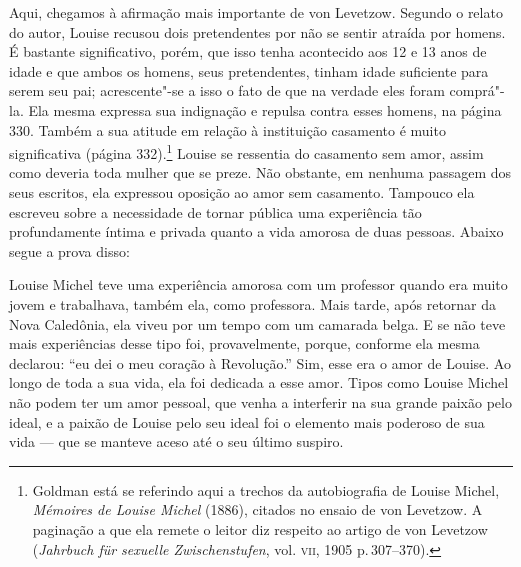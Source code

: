 Aqui, chegamos à afirmação mais importante de von Levetzow. Segundo o
relato do autor, Louise recusou dois pretendentes por não se sentir
atraída por homens. É bastante significativo, porém, que isso tenha
acontecido aos 12 e 13 anos de idade e que ambos os homens, seus
pretendentes, tinham idade suficiente para serem seu pai; acrescente"-se
a isso o fato de que na verdade eles foram comprá"-la. Ela mesma expressa
sua indignação e repulsa contra esses homens, na página 330. Também a
sua atitude em relação à instituição casamento é muito significativa
(página 332).\footnote{Goldman está se referindo aqui a trechos da
  autobiografia de Louise Michel, \textit{Mémoires de Louise Michel}
  (1886), citados no ensaio de von Levetzow. A paginação a que ela
  remete o leitor diz respeito ao artigo de von Levetzow
  (\textit{Jahrbuch für sexuelle Zwischenstufen}, vol. \textsc{vii}, 1905 p.\,307--370).} Louise se ressentia do casamento sem amor, assim como
deveria toda mulher que se preze. Não obstante, em nenhuma passagem dos
seus escritos, ela expressou oposição ao amor sem casamento. Tampouco
ela escreveu sobre a necessidade de tornar pública uma experiência tão
profundamente íntima e privada quanto a vida amorosa de duas pessoas.
Abaixo segue a prova disso:

Louise Michel teve uma experiência amorosa com um professor quando era
muito jovem e trabalhava, também ela, como professora. Mais tarde, após
retornar da Nova Caledônia, ela viveu por um tempo com um camarada
belga. E se não teve mais experiências desse tipo foi, provavelmente,
porque, conforme ela mesma declarou: ``eu dei o meu coração à
Revolução.'' Sim, esse era o amor de Louise. Ao longo de toda a sua
vida, ela foi dedicada a esse amor. Tipos como Louise Michel não podem
ter um amor pessoal, que venha a interferir na sua grande
paixão pelo ideal, e a paixão de Louise pelo seu ideal foi o elemento
mais poderoso de sua vida --- que se manteve aceso até o seu último suspiro.

